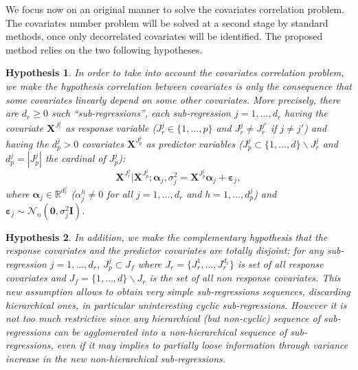 \documentclass[11pt,a4paper]{article}
\newtheorem{hyp}{Hypothesis}
\begin{document}
We focus now on an original manner to solve the covariates correlation problem. The covariates number problem will be solved at a second stage by standard methods, once only decorrelated covariates will be identified. The proposed method relies on the two following hypotheses.

\begin{hyp}\label{H1}
In order to take into account the covariates correlation problem, we make the hypothesis correlation between covariates is {\it only} the consequence that some covariates {\it linearly} depend on some other covariates. More precisely, there are $d_{r}\geq 0$ such ``sub-regressions'', each sub-regression $j=1,\ldots,d_{r}$ having the covariate $\boldsymbol{X}^{J_{r}^j}$ as {\it response} variable ($J_{r}^j\in\{1,\ldots,p\}$ and $J_{r}^j\neq J_{r}^{j'}$ if $j\neq j'$) and having the $d_p^j>0$ covariates $\boldsymbol{X}^{J_{p}^j}$  as {\it predictor} variables ($J_{p}^j\subset\{1,\ldots,d\} \backslash J_{r}^j$ and $d_p^j=|J_{p}^j|$ the cardinal of $J_{p}^j$):
\begin{equation}
\boldsymbol{X}^{J_{r}^j}|\boldsymbol{X}^{J_{p}^j};\boldsymbol{\alpha}_j,\sigma^2_j=\boldsymbol{X}^{J_{p}^j}\boldsymbol{\alpha}_j+\boldsymbol{\varepsilon}_j, \label{eq:SR}
\end{equation}
where $\boldsymbol{\alpha}_j\in{\mathbb{R}^{d_r^j}}$ (${\alpha}_j^h\neq 0$ for all $j=1,\ldots,d_r$ and $h=1,\ldots,d_p^j$) and $\boldsymbol{\varepsilon}_j \sim\mathcal{N}_n(\boldsymbol{0},\sigma^2_j\boldsymbol{I})$.
\end{hyp}

\begin{hyp}\label{H2}
In addition, we make the complementary hypothesis that the response covariates and the predictor covariates are totally disjoint: for any sub-regression $j=1,\ldots,d_{r}$, $J_{p}^j\subset J_f$ where $J_{r}=\{J_{r}^1,\ldots,J_{r}^{d_r}\}$ is set of all response covariates and $J_f=\{1,\ldots,d\} \backslash J_{r}$ is the set of all {\it non} response covariates. This new assumption allows to obtain very simple sub-regressions sequences, discarding hierarchical ones, in particular uninteresting cyclic sub-regressions. However it is not too much restrictive since any hierarchical (but non-cyclic) sequence of sub-regressions can be agglomerated into a non-hierarchical sequence of sub-regressions, even if it may implies to partially loose information through variance increase in the new non-hierarchical sub-regressions.
\end{hyp}
\end{document}
